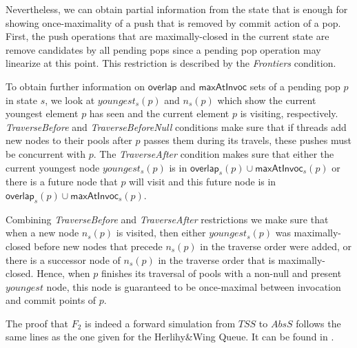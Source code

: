Nevertheless, we can obtain partial information from the state that is enough for showing once-maximality of a push that is removed by commit action of a pop. First, the push operations that are maximally-closed in the current state are remove candidates by all pending pops since a pending pop operation may linearize at this point. This restriction is described by the \emph{Frontiers} condition. 

To obtain further information on $\mathsf{overlap}$ and $\mathsf{maxAtInvoc}$ sets of a pending pop $p$ in state $s$, we look at $youngest_s(p)$ and $n_s(p)$ which show the current youngest element $p$ has seen and the current element $p$ is visiting, respectively. \emph{TraverseBefore} and \emph{TraverseBeforeNull} conditions make sure that if threads add new nodes to their pools after $p$ passes them during its travels, these pushes must be concurrent with $p$. The \emph{TraverseAfter} condition makes sure that either the current youngest node $youngest_s(p)$ is in $\mathsf{overlap}_s(p) \cup \mathsf{maxAtInvoc}_s(p)$ or there is a future node that $p$ will visit and this future node is in $\mathsf{overlap}_s(p) \cup \mathsf{maxAtInvoc}_s(p)$. 

Combining \emph{TraverseBefore} and \emph{TraverseAfter} restrictions we make sure that when a new node $n_s(p)$ is visited, then either $youngest_s(p)$ was maximally-closed before new nodes that precede $n_s(p)$ in the traverse order were added, or there is a successor node of $n_s(p)$ in the traverse order that is maximally-closed. Hence, when $p$ finishes its traversal of pools with a non-null and present $youngest$ node, this node is guaranteed to be once-maximal between invocation and commit points of $p$.

The proof that $F_2$ is indeed a forward simulation from $\mathit{TSS}$ to $AbsS$ follows the same lines as the one given for the Herlihy\&Wing Queue. It can be found in \cite{extended}.








